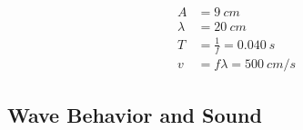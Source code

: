 \documentclass[]{exam}
\begin{document}
\begin{questions}
\begin{EnvUplevel}
{\begin{minipage}{7.5cm}
{\begin{align*}
    A &= \SI{9}{cm} \\[1ex]
    \lambda &= \SI{20}{cm} \\[1ex]
    T &= \frac{1}{f} = \SI{0.040}{s} \\[1ex]
    v &= f\lambda = \SI{500}{cm/s}
\end{align*}
}
\end{minipage}

}
\end{EnvUplevel}



\end{questions}

\clearpage


\subsection*{Wave Behavior and Sound}

\bgroup
\end{document}
